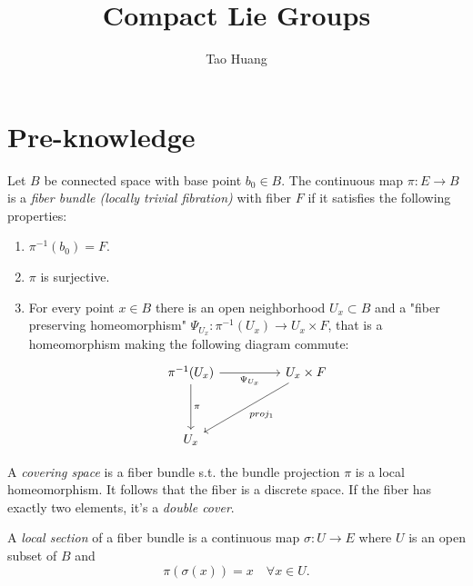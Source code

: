 \documentclass[11pt]{homework}
\title{Compact Lie Groups}
\author{Tao Huang}
\begin{document}
    
\maketitle

\section*{Pre-knowledge}

\begin{definition}
    Let $B$ be connected space with base point $b_0\in B$.
    The continuous map $\pi : E \rightarrow B$ is a \textit{fiber bundle (locally trivial fibration)} with fiber $F$ if it satisfies the following properties:
    \begin{enumerate}
        \item $\pi^{-1}(b_0) = F$.
        \item $\pi$ is surjective.
        \item For every point $x\in B$ there is an open neighborhood $U_x \subset B$ and a "fiber preserving homeomorphism" $\Psi_{U_{x}}: \pi^{-1}\left(U_{x}\right) \rightarrow U_{x} \times F$, that is a homeomorphism making the following diagram commute:
        \[\begin{tikzcd}
            {\pi^{-1}(U_x)} && {U_x \times F} \\
            \\
            {U_x} && {}
            \arrow["\pi", from=1-1, to=3-1]
            \arrow["{\Psi_{U_{x}}}"', from=1-1, to=1-3]
            \arrow["{proj_1}", from=1-3, to=3-1]
        \end{tikzcd}\]
    \end{enumerate}
\end{definition}

\begin{definition}
    A \textit{covering space} is a fiber bundle s.t. the bundle projection $\pi$ is a local homeomorphism. It follows that the fiber is a discrete space. If the fiber has exactly two elements, it's a \textit{double cover}.
\end{definition}

\begin{definition}
    A \textit{local section} of a fiber bundle is a continuous map $\sigma : U \rightarrow E$ where $U$ is an open subset of $B$ and
    \begin{equation*}
        \pi(\sigma(x)) = x \quad \forall x \in U.
    \end{equation*}
\end{definition}
\end{document}

